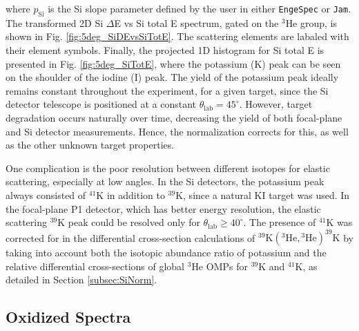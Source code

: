 \pagebreak

\noindent
where $p_{\mathrm{Si}}$ is the Si slope parameter defined by the user in either \texttt{EngeSpec} or \texttt{Jam}. The transformed 2D Si $\Delta$E vs Si total E spectrum, gated on the $^{3}$He group, is shown in Fig. \ref{fig:5deg_SiDEvsSiTotE}. The scattering elements are labaled with their element symbols. Finally, the projected 1D histogram for Si total E is presented in Fig. \ref{fig:5deg_SiTotE}, where the potassium (K) peak can be seen on the shoulder of the iodine (I) peak. The yield of the potassium peak ideally remains constant throughout the experiment, for a given target, since the Si detector telescope is positioned at a constant $\theta_{\mathrm{lab}} = 45^{\circ}$. However, target degradation occurs naturally over time, decreasing the yield of both focal-plane and Si detector measurements. Hence, the normalization corrects for this, as well as the other unknown target properties. 

One complication is the poor resolution between different isotopes for elastic scattering, especially at low angles. In the Si detectors, the potassium peak always consisted of $^{41}$K in addition to $^{39}$K, since a natural KI target was used. In the focal-plane P1 detector, which has better energy resolution, the elastic scattering $^{39}$K peak could be resolved only for $\theta_{\mathrm{lab}} \geq 40^{\circ}$. The presence of $^{41}$K was corrected for in the differential cross-section calculations of $^{39}\mathrm{K}(^{3}\mathrm{He}, {}^{3}\mathrm{He})^{39}\mathrm{K}$ by taking into account both the isotopic abundance ratio of potassium and the relative differential cross-sections of global $^{3}$He OMPs for $^{39}$K and $^{41}$K, as detailed in Section \ref{subsec:SiNorm}.

\subsection{Oxidized Spectra}


